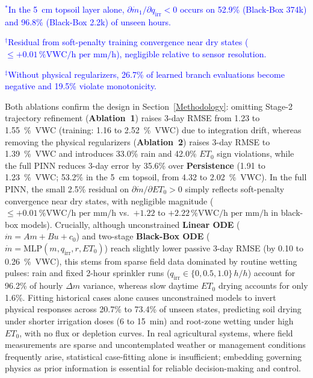 \documentclass[pdflatex,sn-nature]{sn-jnl}%
\theoremstyle{thmstyleone}%
\theoremstyle{thmstyletwo}%
\theoremstyle{thmstylethree}%
\begin{document}
{\begin{table}[!htbp]
\begin{tablenotes}
\footnotesize
\item \textcolor{blue}{$^*$In the 5~\si{cm} topsoil layer alone, $\partial \dot{m}_1/\partial q_{\mathrm{irr}} < 0$ occurs on 52.9\% (Black-Box 374k) and 96.8\% (Black-Box 2.2k) of unseen hours.}
\item \textcolor{blue}{$^\dagger$Residual from soft-penalty training convergence near dry states ($\le +0.01\,\text{\%VWC/h per mm/h}$), negligible relative to sensor resolution.}
\item \textcolor{blue}{$^\ddagger$Without physical regularizers, 26.7\% of learned branch evaluations become negative and 19.5\% violate monotonicity.}
\end{tablenotes}
\end{table}

Both ablations confirm the design in Section~\ref{Methodology}: omitting Stage-2 trajectory refinement (\textbf{Ablation~1}) raises 3-day RMSE from 1.23 to 1.55~\si{\%VWC} (training: 1.16 to 2.52~\si{\%VWC}) due to integration drift, whereas removing the physical regularizers (\textbf{Ablation~2}) raises 3-day RMSE to 1.39~\si{\%VWC} and introduces 33.0\% rain and 42.0\% $ET_0$ sign violations, while the full PINN reduces 3-day error by 35.6\% over \textbf{Persistence} (1.91 to 1.23~\si{\%VWC}; 53.2\% in the 5~\si{cm} topsoil, from 4.32 to 2.02~\si{\%VWC}). In the full PINN, the small 2.5\% residual on $\partial \dot{m}/\partial ET_0 > 0$ simply reflects soft-penalty convergence near dry states, with negligible magnitude ($\le +0.01\,\text{\%VWC/h per mm/h}$ vs.\ $+1.22$ to $+2.22\,\text{\%VWC/h per mm/h}$ in black-box models). Crucially, although unconstrained \textbf{Linear ODE} ($\dot{m} = Am + Bu + c_0$) and two-stage \textbf{Black-Box ODE} ($\dot{m} = \mathrm{MLP}(m, q_{\mathrm{irr}}, r, ET_0)$) reach slightly lower passive 3-day RMSE (by 0.10 to 0.26~\si{\%VWC}), this stems from sparse field data dominated by routine wetting pulses: rain and fixed 2-hour sprinkler runs ($q_{\mathrm{irr}} \in \{0, 0.5, 1.0\}\,\si{h/h}$) account for 96.2\% of hourly $\Delta m$ variance, whereas slow daytime $ET_0$ drying accounts for only 1.6\%. Fitting historical cases alone causes unconstrained models to invert physical responses across 20.7\% to 73.4\% of unseen states, predicting soil drying under shorter irrigation doses (6 to 15~\si{min}) and root-zone wetting under high $ET_0$, with no flux or depletion curves. In real agricultural systems, where field measurements are sparse and uncontemplated weather or management conditions frequently arise, statistical case-fitting alone is insufficient; embedding governing physics as prior information is essential for reliable decision-making and control.

}
\end{document}
